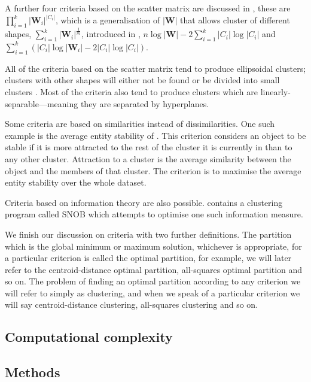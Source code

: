 \documentclass[a4paper]{report}
\begin{document}
A further four criteria based on the scatter matrix are discussed in
\citep{marriott1982optimization}, these are
$\prod_{i=1}^{k}|\mathbf{W}_i|^{|C_i|}$, which is a generalisation of
$|\mathbf{W}|$ that allows cluster of different shapes,
$\sum_{i=1}^{k}|\mathbf{W}_i|^{\frac{1}{m}}$, introduced in
\citep{maronna1974}, $n \log{|\mathbf{W}|} - 2\sum_{i=1}^{k} |C_i|
\log{|C_i|}$ and $\sum_{i=1}^{k} (|C_i| \log{|\mathbf{W}_i|} -
2|C_i|\log{|C_i|})$.

All of the criteria based on the scatter matrix tend to produce ellipsoidal
clusters; clusters with other shapes will either not be found or be divided
into small clusters \citep{marriott1982optimization}.  Most of the criteria
also tend to produce clusters which are linearly-separable---meaning they are
separated by hyperplanes.

Some criteria are based on similarities instead of dissimilarities.  One such
example is the average entity stability of \citep{Rubin67optimal}.  This
criterion considers an object to be stable if it is more attracted to the rest
of the cluster it is currently in than to any other cluster.  Attraction to a
cluster is the average similarity between the object and the members of that
cluster.  The criterion is to maximise the average entity stability over the
whole dataset.

Criteria based on information theory are also possible.
\citet{wallace1968information} contains a clustering program called SNOB which
attempts to optimise one such information measure.

We finish our discussion on criteria with two further definitions.  The
partition which is the global minimum or maximum solution, whichever is
appropriate, for a particular criterion is called the optimal partition, for
example, we will later refer to the centroid-distance optimal partition,
all-squares optimal partition and so on.  The problem of finding an optimal
partition according to any criterion we will refer to simply as clustering,
and when we speak of a particular criterion we will say centroid-distance
clustering, all-squares clustering and so on.

\subsection{Computational complexity}
\label{sec:complexity-issues}



\subsection{Methods}
\label{sec:methods}
\end{document}
